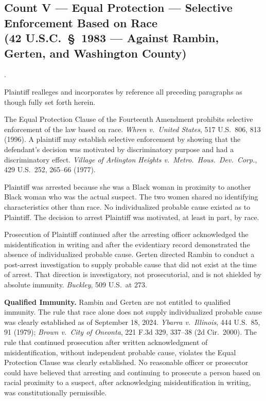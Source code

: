 \documentclass[12pt,letterpaper]{article}
\newcounter{complaintpara}
\newenvironment{paras}{%
	\begin{list}{\arabic{complaintpara}.}{%
			\setlength{\leftmargin}{0.5in}%
			\setlength{\labelwidth}{0.4in}%
			\setlength{\labelsep}{0.1in}%
			\setlength{\itemsep}{0pt}%
			\setlength{\parsep}{0pt}%
			\setlength{\topsep}{6pt}%
		}%
	}{%
	\end{list}%
}
\begin{document}
	\subsection*{Count V --- Equal Protection --- Selective Enforcement Based on Race\\
		(42 U.S.C.\ \S\ 1983 --- Against Rambin, Gerten, and Washington County)}
	\begin{paras}
		
		\item Plaintiff realleges and incorporates by reference all
		preceding paragraphs as though fully set forth herein.
		
		\item The Equal Protection Clause of the Fourteenth Amendment
		prohibits selective enforcement of the law based on race.
		\textit{Whren v.\ United States}, 517 U.S.\ 806, 813 (1996).
		A plaintiff may establish selective enforcement by showing
		that the defendant's decision was motivated by discriminatory
		purpose and had a discriminatory effect.
		\textit{Village of Arlington Heights v.\ Metro.\ Hous.\ Dev.\
			Corp.}, 429 U.S.\ 252, 265--66 (1977).
		
		\item Plaintiff was arrested because she was a Black woman in
		proximity to another Black woman who was the actual suspect.
		The two women shared no identifying characteristics other than
		race. No individualized probable cause existed as to
		Plaintiff. The decision to arrest Plaintiff was motivated, at
		least in part, by race.
		
		\item Prosecution of Plaintiff continued after the arresting
		officer acknowledged the misidentification in writing and
		after the evidentiary record demonstrated the absence of
		individualized probable cause. Gerten directed Rambin to
		conduct a post-arrest investigation to supply probable cause
		that did not exist at the time of arrest. That direction is
		investigatory, not prosecutorial, and is not shielded by
		absolute immunity. \textit{Buckley}, 509 U.S.\ at 273.
		
		\item \textbf{Qualified Immunity.} Rambin and Gerten are not
		entitled to qualified immunity. The rule that race alone does
		not supply individualized probable cause was clearly
		established as of September 18, 2024.
		\textit{Ybarra v.\ Illinois}, 444 U.S.\ 85, 91 (1979);
		\textit{Brown v.\ City of Oneonta}, 221 F.3d 329, 337--38
		(2d Cir.\ 2000). The rule that continued prosecution after
		written acknowledgment of misidentification, without
		independent probable cause, violates the Equal Protection
		Clause was clearly established. No reasonable officer or
		prosecutor could have believed that arresting and continuing
		to prosecute a person based on racial proximity to a suspect,
		after acknowledging misidentification in writing, was
		constitutionally permissible.
		

\end{paras}
\end{document}
